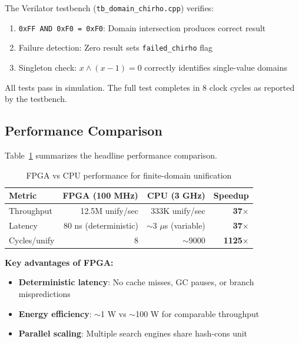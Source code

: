 \documentclass[11pt,a4paper]{article}
\begin{document}
The Verilator testbench (\texttt{tb\_domain\_chirho.cpp}) verifies:

\begin{enumerate}
  \item \texttt{0xFF AND 0xF0 = 0xF0}: Domain intersection produces correct result
  \item Failure detection: Zero result sets \texttt{failed\_chirho} flag
  \item Singleton check: $x \land (x-1) = 0$ correctly identifies single-value domains
\end{enumerate}

All tests pass in simulation. The full test completes in 8 clock cycles as
reported by the testbench.

\subsection{Performance Comparison}
\label{subsec:performance_chirho}

Table~\ref{tab:comparison_chirho} summarizes the headline performance comparison.

\begin{table}[ht]
\centering
\caption{FPGA vs CPU performance for finite-domain unification}
\label{tab:comparison_chirho}
\begin{tabular}{lrrr}
\toprule
\textbf{Metric} & \textbf{FPGA (100 MHz)} & \textbf{CPU (3 GHz)} & \textbf{Speedup} \\
\midrule
Throughput & 12.5M unify/sec & 333K unify/sec & \textbf{37$\times$} \\
Latency & 80 ns (deterministic) & $\sim$3 $\mu$s (variable) & \textbf{37$\times$} \\
Cycles/unify & 8 & $\sim$9000 & \textbf{1125$\times$} \\
\bottomrule
\end{tabular}
\end{table}

\textbf{Key advantages of FPGA:}
\begin{itemize}
  \item \textbf{Deterministic latency}: No cache misses, GC pauses, or branch mispredictions
  \item \textbf{Energy efficiency}: $\sim$1 W vs $\sim$100 W for comparable throughput
  \item \textbf{Parallel scaling}: Multiple search engines share hash-cons unit
\end{itemize}

\end{document}
